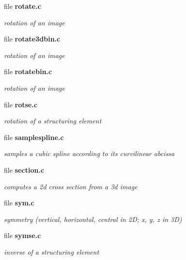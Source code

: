 \begin{CompactItemize}
\item 
file \bf{rotate.c}
\begin{CompactList}\small\item\em rotation of an image \item\end{CompactList}

\item 
file \bf{rotate3dbin.c}
\begin{CompactList}\small\item\em rotation of an image \item\end{CompactList}

\item 
file \bf{rotatebin.c}
\begin{CompactList}\small\item\em rotation of an image \item\end{CompactList}

\item 
file \bf{rotse.c}
\begin{CompactList}\small\item\em rotation of a structuring element \item\end{CompactList}

\item 
file \bf{samplespline.c}
\begin{CompactList}\small\item\em samples a cubic spline according to its curvilinear abcissa \item\end{CompactList}

\item 
file \bf{section.c}
\begin{CompactList}\small\item\em computes a 2d cross section from a 3d image \item\end{CompactList}

\item 
file \bf{sym.c}
\begin{CompactList}\small\item\em symmetry (vertical, horizontal, central in 2D; x, y, z in 3D) \item\end{CompactList}

\item 
file \bf{symse.c}
\begin{CompactList}\small\item\em inverse of a structuring element \item\end{CompactList}


\end{CompactItemize}
